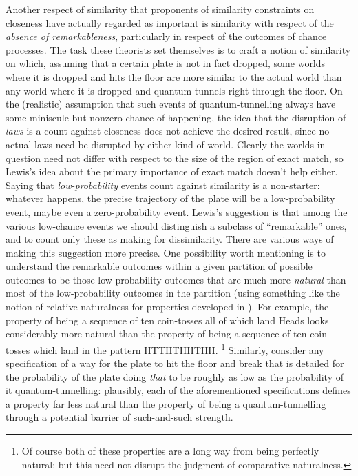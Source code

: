 \documentclass[If.tex]{subfiles}
\begin{document}
Another respect of similarity that proponents of similarity constraints on closeness have actually regarded as important is similarity with respect of the \emph{absence of remarkableness}, particularly in respect of the outcomes of chance processes. The task these theorists set themselves is to craft a notion of similarity on which, assuming that a certain plate is not in fact dropped, some worlds where it is dropped and hits the floor are more similar to the actual world than any world where it is dropped and quantum-tunnels right through the floor. On the (realistic) assumption that such events of quantum-tunnelling always have some miniscule but nonzero chance of happening, the idea that the disruption of \emph{laws} is a count against closeness does not achieve the desired result, since no actual laws need be disrupted by either kind of world. Clearly the worlds in question need not differ with respect to the size of the region of exact match, so Lewis's idea about the primary importance of exact match doesn't help either. Saying that \emph{low-probability} events count against similarity is a non-starter: whatever happens, the precise trajectory of the plate will be a low-probability event, maybe even a zero-probability event. Lewis's suggestion is that among the various low-chance events we should distinguish a subclass of “remarkable” ones, and to count only these as making for dissimilarity. There are various ways of making this suggestion more precise. One possibility worth mentioning is to understand the remarkable outcomes within a given partition of possible outcomes to be those low-probability outcomes that are much more \emph{natural} than most of the low-probability outcomes in the partition (using something like the notion of relative naturalness for properties developed in \cite{LewisNWTU}). For example, the property of being a sequence of ten coin-tosses all of which land Heads looks considerably more natural than the property of being a sequence of ten coin-tosses which land in the pattern HTTHTHHTHH.%
\footnote{Of course both of these properties are a long way from being perfectly natural; but this need not disrupt the judgment of comparative naturalness.} 
Similarly, consider any specification of a way for the plate to hit the floor and break that is detailed for the probability of the plate doing \emph{that} to be roughly as low as the probability of it quantum-tunnelling: plausibly, each of the aforementioned specifications defines a property far less natural than the property of being a quantum-tunnelling through a potential barrier of such-and-such strength.%
\end{document}
